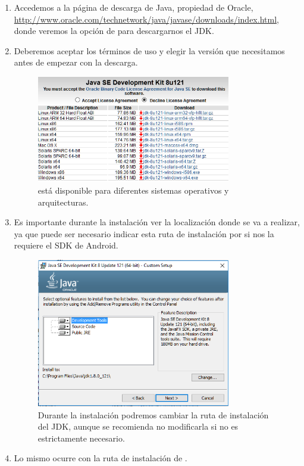 \begin{enumerate}
  \item Accedemos a la página de descarga de Java, propiedad de Oracle, \url{http://www.oracle.com/technetwork/java/javase/downloads/index.html}, donde veremos la opción de para descargarnos el \gls{JDK}.
  \item Deberemos aceptar los términos de uso y elegir la versión que necesitamos antes de empezar con la descarga.
  \begin{figure}[H]
\centering
    \includegraphics[width=0.8\textwidth]{Figures/anexo/android_tools/jdk_download}
    \caption{ está disponible para diferentes sistemas operativos y arquitecturas.}
  \end{figure}
  \item Es importante durante la instalación ver la localización donde se va a realizar, ya que puede ser necesario indicar esta ruta de instalación por si nos la requiere el SDK de Android.
  \begin{figure}[H]
\centering
    \includegraphics[width=0.8\textwidth]{Figures/anexo/android_tools/jdk_custom_setup_1}
    \caption{Durante la instalación podremos cambiar la ruta de instalación del \gls{JDK}, aunque se recomienda no modificarla si no es estrictamente necesario.}
  \end{figure}
  \item  Lo mismo ocurre con la ruta de instalación de .
\end{enumerate}

